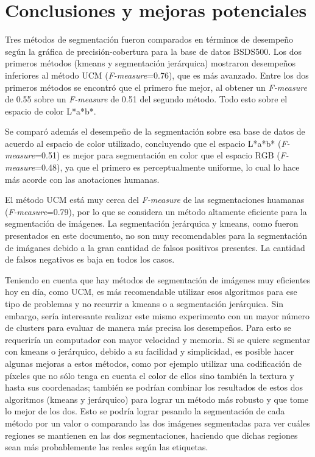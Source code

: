 \documentclass[10pt,twocolumn,letterpaper]{article}
\begin{document}
\section{Conclusiones y mejoras potenciales}

Tres métodos de segmentación fueron comparados en términos de desempeño según la gráfica de precisión-cobertura para la base de datos BSDS500. Los dos primeros métodos (kmeans y segmentación jerárquica) mostraron desempeños inferiores al método UCM (\textit{F-measure}=0.76), que es más avanzado. Entre los dos primeros métodos se encontró que el primero fue mejor, al obtener un \textit{F-measure} de 0.55 sobre  un \textit{F-measure} de 0.51 del segundo método. Todo esto sobre el espacio de color L*a*b*. 

Se comparó además el desempeño de la segmentación sobre esa base de datos de acuerdo al espacio de color utilizado, concluyendo que el espacio L*a*b* (\textit{F-measure}=0.51) es mejor para segmentación en color que el espacio RGB (\textit{F-measure}=0.48), ya que el primero es perceptualmente uniforme, lo cual lo hace más acorde con las anotaciones humanas.

El método UCM está muy cerca del \textit{F-measure} de las segmentaciones huamanas (\textit{F-measure}=0.79), por lo que se considera un método altamente eficiente para la segmentación de imágenes. La segmentación jerárquica y kmeans, como fueron presentados en este documento, no son muy recomendables para la segmentación de imáganes debido a la gran cantidad de falsos positivos presentes. La cantidad de falsos negativos es baja en todos los casos.

Teniendo en cuenta que hay métodos de segmentación de imágenes muy eficientes hoy en día, como UCM, es más recomendable utilizar esos algoritmos para ese tipo de problemas y no recurrir a kmeans o a segmentación jerárquica. Sin embargo, sería interesante realizar este mismo experimento con un mayor número de clusters para evaluar de manera más precisa los desempeños. Para esto se requeriría un computador con mayor velocidad y memoria. Si se quiere segmentar con kmeans o jerárquico, debido a su facilidad y simplicidad, es posible hacer algunas mejoras a estos métodos, como por ejemplo utilizar una codificación de píxeles que no sólo tenga en cuenta el color de ellos sino también la textura y hasta sus coordenadas; también se podrían combinar los resultados de estos dos algoritmos (kmeans y jerárquico) para lograr un método más robusto y que tome lo mejor de los dos. Esto se podría lograr pesando la segmentación de cada método por un valor o comparando las dos imágenes  segmentadas para ver cuáles regiones se mantienen en las dos segmentaciones, haciendo que dichas regiones sean más probablemente las reales según las etiquetas. 



{\small

{}
}
\end{document}
